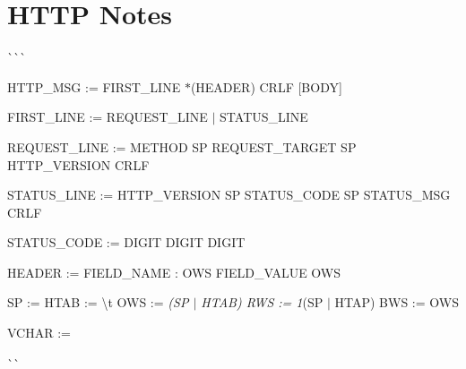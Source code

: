 \chapter{HTTP Notes }
\hypertarget{md_readme}{}\label{md_readme}
\label{md_readme_autotoc_md0}%
%


\`{}\`{}\`{}

HTTP\+\_\+\+MSG \+:= FIRST\+\_\+\+LINE \texorpdfstring{$\ast$}{*}(HEADER) CRLF \mbox{[}BODY\mbox{]}

FIRST\+\_\+\+LINE \+:= REQUEST\+\_\+\+LINE \texorpdfstring{$\vert$}{|} STATUS\+\_\+\+LINE

REQUEST\+\_\+\+LINE \+:= METHOD SP REQUEST\+\_\+\+TARGET SP HTTP\+\_\+\+VERSION CRLF

STATUS\+\_\+\+LINE \+:= HTTP\+\_\+\+VERSION SP STATUS\+\_\+\+CODE SP STATUS\+\_\+\+MSG CRLF

STATUS\+\_\+\+CODE \+:= DIGIT DIGIT DIGIT

HEADER \+:= FIELD\+\_\+\+NAME \textquotesingle{}\+:\textquotesingle{} OWS FIELD\+\_\+\+VALUE OWS

SP \+:= \textquotesingle{} \textquotesingle{} HTAB \+:= \textquotesingle{}\textbackslash{}t\textquotesingle{} OWS \+:= {\itshape (SP \texorpdfstring{$\vert$}{|} HTAB) RWS \+:= 1}(SP \texorpdfstring{$\vert$}{|} HTAP) BWS \+:= OWS

VCHAR \+:=

\`{}\`{} 